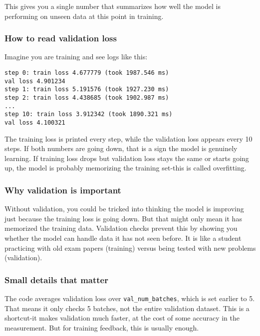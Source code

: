 \documentclass[
  letterpaper,
  DIV=11,
  numbers=noendperiod]{scrreprt}
\begin{document}
This gives you a single number that summarizes how well the model is
performing on unseen data at this point in training.

\subsubsection{How to read validation
loss}\label{how-to-read-validation-loss}

Imagine you are training and see logs like this:

\begin{verbatim}
step 0: train loss 4.677779 (took 1987.546 ms)
val loss 4.901234
step 1: train loss 5.191576 (took 1927.230 ms)
step 2: train loss 4.438685 (took 1902.987 ms)
...
step 10: train loss 3.912342 (took 1890.321 ms)
val loss 4.100321
\end{verbatim}

The training loss is printed every step, while the validation loss
appears every 10 steps. If both numbers are going down, that is a sign
the model is genuinely learning. If training loss drops but validation
loss stays the same or starts going up, the model is probably memorizing
the training set-this is called overfitting.

\subsubsection{Why validation is
important}\label{why-validation-is-important}

Without validation, you could be tricked into thinking the model is
improving just because the training loss is going down. But that might
only mean it has memorized the training data. Validation checks prevent
this by showing you whether the model can handle data it has not seen
before. It is like a student practicing with old exam papers (training)
versus being tested with new problems (validation).

\subsubsection{Small details that
matter}\label{small-details-that-matter}

The code averages validation loss over \texttt{val\_num\_batches}, which
is set earlier to 5. That means it only checks 5 batches, not the entire
validation dataset. This is a shortcut-it makes validation much faster,
at the cost of some accuracy in the measurement. But for training
feedback, this is usually enough.
\end{document}
